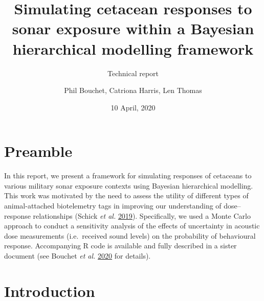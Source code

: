 \documentclass[
]{article}
\title{Simulating cetacean responses to sonar exposure within a Bayesian hierarchical modelling framework}
\subtitle{Technical report}
\author{Phil Bouchet, Catriona Harris, Len Thomas}
\date{10 April, 2020}
\begin{document}
\maketitle

{
\hypersetup{linkcolor=black}
\setcounter{tocdepth}{3}
\tableofcontents
}
\section{Preamble}

In this report, we present a framework for simulating responses of cetaceans to various military sonar exposure contexts using Bayesian hierarchical modelling. This work was motivated by the need to assess the utility of different types of animal-attached biotelemetry tags in improving our understanding of dose--response relationships (Schick \emph{et al.} \protect\hyperlink{ref-Schick2019}{2019}). Specifically, we used a Monte Carlo approach to conduct a sensitivity analysis of the effects of uncertainty in acoustic dose measurements (i.e.~received sound levels) on the probability of behavioural response. Accompanying R code is available and fully described in a sister document (see Bouchet \emph{et al.} \protect\hyperlink{ref-Bouchet2020b}{2020} for details).

\section{Introduction}
\end{document}
